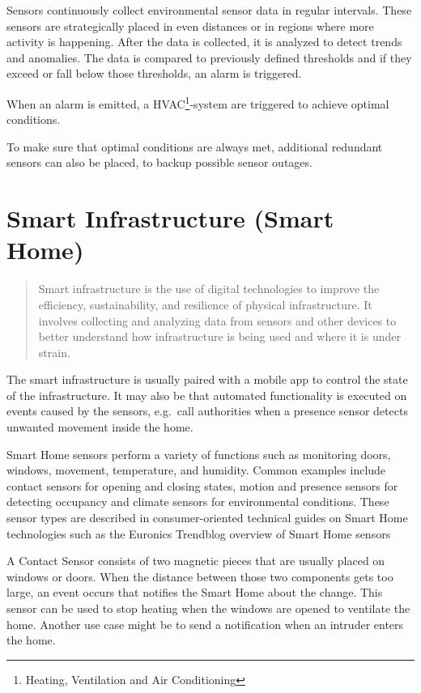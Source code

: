 Sensors continuously collect environmental sensor data in regular intervals. These sensors are strategically placed in even distances or in regions where more activity is happening. After the data is collected, it is analyzed to detect trends and anomalies. The data is compared to previously defined thresholds and if they exceed or fall below those thresholds, an alarm is triggered.

When an alarm is emitted, a HVAC\footnote{Heating, Ventilation and Air Conditioning}-system are triggered to achieve optimal conditions.

To make sure that optimal conditions are always met, additional redundant sensors can also be placed, to backup possible sensor outages.

\noindent\cite{LRWeb:56}

\section{Smart Infrastructure (Smart Home)}
\begin{quote}
    Smart infrastructure is the use of digital technologies to improve the efficiency, sustainability, and resilience of physical infrastructure. It involves collecting and analyzing data from sensors and other devices to better understand how infrastructure is being used and where it is under strain.
\end{quote}

\noindent\cite{LRWeb:45}

The smart infrastructure is usually paired with a mobile app to control the state of the infrastructure. It may also be that automated functionality is executed on events caused by the sensors, e.g.\ call authorities when a presence sensor detects unwanted movement inside the home.

Smart Home sensors perform a variety of functions such as monitoring doors, windows, movement, temperature, and humidity. Common examples include contact sensors for opening and closing states, motion and presence sensors for detecting occupancy and climate sensors for environmental conditions. These sensor types are described in consumer-oriented technical guides on Smart Home technologies such as the Euronics Trendblog overview of Smart Home sensors

A Contact Sensor consists of two magnetic pieces that are usually placed on windows or doors. When the distance between those two components gets too large, an event occurs that notifies the Smart Home about the change. This sensor can be used to stop heating when the windows are opened to ventilate the home. Another use case might be to send a notification when an intruder enters the home.

